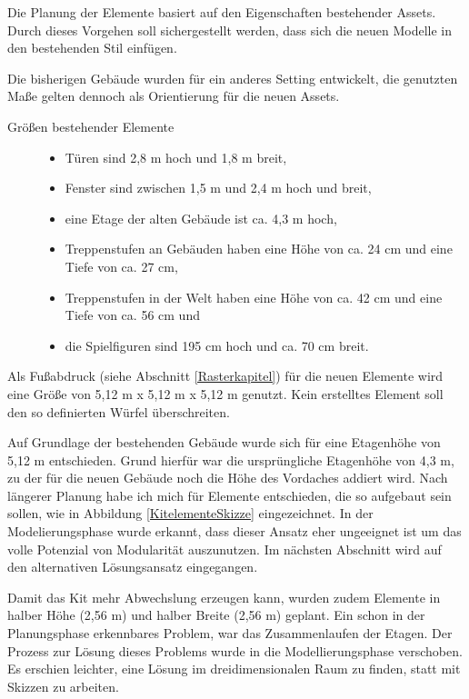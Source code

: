 \par
Die Planung der Elemente basiert auf den Eigenschaften bestehender Assets. Durch dieses Vorgehen soll sichergestellt werden, dass sich die neuen Modelle in den bestehenden Stil einfügen.
\par
Die bisherigen Gebäude wurden für ein anderes Setting entwickelt, die genutzten Maße gelten dennoch als Orientierung für die neuen Assets.
\newpage
\begin{description}
\item[Größen bestehender Elemente]\hfill
\begin{itemize}[leftmargin=0cm]
\item Türen sind 2,8 m hoch und 1,8 m breit,
\item Fenster sind zwischen 1,5 m und 2,4 m hoch und breit,
\item eine Etage der alten Gebäude ist ca. 4,3 m hoch,
\item Treppenstufen an Gebäuden haben eine Höhe  von ca. 24 cm und eine Tiefe von ca. 27 cm,
\item Treppenstufen in der Welt haben eine Höhe  von ca. 42 cm und eine Tiefe von ca. 56 cm und
\item die Spielfiguren sind 195 cm hoch und ca. 70 cm breit.
\end{itemize}
\end{description}
Als Fußabdruck (siehe Abschnitt \ref{Rasterkapitel}) für die neuen Elemente wird eine Größe von 5,12 m x 5,12 m x 5,12 m genutzt. Kein erstelltes Element soll den so definierten Würfel überschreiten.
\par
Auf Grundlage der bestehenden Gebäude wurde sich für eine Etagenhöhe von 5,12 m entschieden. Grund hierfür war die ursprüngliche Etagenhöhe von 4,3 m, zu der für die neuen Gebäude noch die Höhe des Vordaches addiert wird. Nach längerer Planung habe ich mich für Elemente entschieden, die so aufgebaut sein sollen, wie in Abbildung \ref{KitelementeSkizze} eingezeichnet. In der Modelierungsphase wurde erkannt, dass dieser Ansatz eher ungeeignet ist um das volle Potenzial von Modularität auszunutzen. Im nächsten Abschnitt wird auf den alternativen Lösungsansatz eingegangen.
\par
Damit das Kit mehr Abwechslung erzeugen kann, wurden zudem Elemente in halber Höhe (2,56 m) und halber Breite (2,56 m) geplant. Ein schon in der Planungsphase erkennbares Problem, war das Zusammenlaufen der Etagen. Der Prozess zur Lösung dieses Problems wurde in die Modellierungsphase verschoben. Es erschien leichter, eine Lösung im dreidimensionalen Raum zu finden, statt mit Skizzen zu arbeiten.
